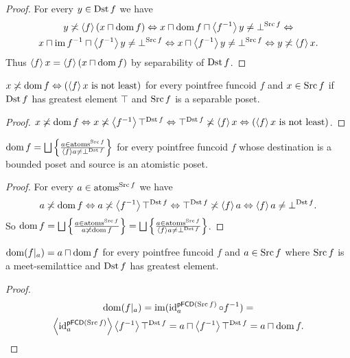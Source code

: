 \begin{proof}
For every $y\in\Dst f$ we have
\begin{multline*}
y\nasymp\supfun f(x\sqcap\dom f)\Leftrightarrow x\sqcap\dom f\sqcap\supfun{f^{-1}}y\ne\bot^{\Src f}\Leftrightarrow\\
x\sqcap\im f^{-1}\sqcap\supfun{f^{-1}}y\ne\bot^{\Src f}\Leftrightarrow x\sqcap\supfun{f^{-1}}y\ne\bot^{\Src f}\Leftrightarrow y\nasymp\supfun fx.
\end{multline*}
Thus $\supfun fx=\supfun f(x\sqcap\dom f)$ by separability of $\Dst f$.\end{proof}
\begin{prop}
$x\nasymp\dom f\Leftrightarrow(\supfun fx\text{ is not least})$ for
every pointfree funcoid $f$ and $x\in\Src f$ if $\Dst f$ has greatest
element $\top$ and $\Src f$ is a separable poset.\end{prop}
\begin{proof}
$x\nasymp\dom f\Leftrightarrow x\nasymp\supfun{f^{-1}}\top^{\Dst f}\Leftrightarrow\top^{\Dst f}\nasymp\supfun fx\Leftrightarrow(\supfun fx\text{ is not least})$.\end{proof}
\begin{prop}
$\dom f=\bigsqcup\setcond{a\in\atoms^{\Src f}}{\supfun fa\ne\bot^{\Dst f}}$
for every pointfree funcoid $f$ whose destination is a bounded poset
and source is an atomistic poset.\end{prop}
\begin{proof}
For every $a\in\atoms^{\Src f}$ we have 
\[
a\nasymp\dom f\Leftrightarrow a\nasymp\supfun{f^{-1}}\top^{\Dst f}\Leftrightarrow\top^{\Dst f}\nasymp\supfun fa\Leftrightarrow\supfun fa\ne\bot^{\Dst f}.
\]
So $\dom f=\bigsqcup\setcond{a\in\atoms^{\Src f}}{a\nasymp\dom f}=\bigsqcup\setcond{a\in\atoms^{\Src f}}{\supfun fa\ne\bot^{\Dst f}}$.\end{proof}
\begin{prop}
$\dom(f|_{a})=a\sqcap\dom f$ for every pointfree funcoid $f$ and
$a\in\Src f$ where $\Src f$ is a meet-semilattice and
$\Dst f$ has greatest element.\end{prop}
\begin{proof}
~
\begin{multline*}
\dom(f|_{a})=\im(\id_{a}^{\mathsf{pFCD}(\Src f)}\circ f^{-1})=\\
\supfun{\id_{a}^{\mathsf{pFCD}(\Src f)}}\supfun{f^{-1}}\top^{\Dst f}=a\sqcap\supfun{f^{-1}}\top^{\Dst f}=a\sqcap\dom f.
\end{multline*}
\end{proof}
